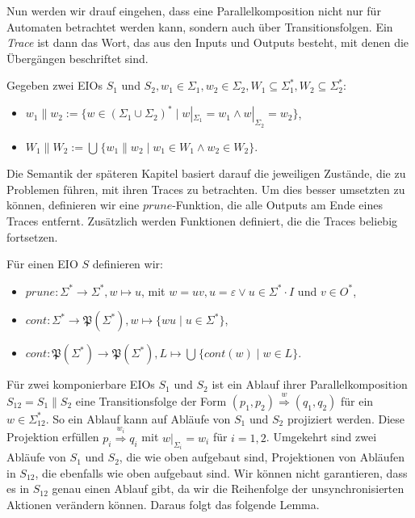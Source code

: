 Nun werden wir drauf eingehen, dass eine Parallelkomposition nicht nur für
Automaten betrachtet werden kann, sondern auch über Transitionsfolgen. Ein
\emph{Trace} ist dann das Wort, das aus den Inputs und Outputs besteht, mit denen die
Übergängen beschriftet sind.

\begin{Def}
  Gegeben zwei EIOs $S_1$ und $S_2,
  w_1\in\Sigma _1, w_2\in\Sigma _2, W_1\subseteq\Sigma _1^*, W_2\subseteq\Sigma
  _2^*$:
  \begin{itemize}
    \item $w_1\| w_2:=\{w\in (\Sigma _1\cup\Sigma _2)^*\mid w|_{\Sigma _1}=w_1\wedge
      w|_{\Sigma _2}=w_2\}$,
    \item $W_1\| W_2:=\bigcup\hspace{1pt}\{w_1\| w_2\mid w_1\in W_1\wedge w_2\in W_2\}$.
  \end{itemize}
\end{Def}

Die Semantik der späteren Kapitel basiert darauf die jeweiligen Zustände, die
zu Problemen führen, mit ihren Traces zu betrachten. Um dies besser umsetzten zu
können, definieren wir eine $prune$-Funktion, die alle Outputs am Ende
eines Traces entfernt. Zusätzlich werden Funktionen definiert, die
die Traces beliebig fortsetzen.

\begin{Def}
  Für einen EIO $S$ definieren wir:
  \begin{itemize}
    \item $prune:\Sigma ^*\rightarrow\Sigma ^*, w\mapsto u$, mit $w=uv,
      u=\varepsilon\vee u\in\Sigma ^*\cdot I$ und $v\in O^*$,
    \item $cont:\Sigma ^*\rightarrow\mathfrak{P}(\Sigma ^*),
      w\mapsto\{wu\mid u\in\Sigma ^*\}$,
    \item $cont:\mathfrak{P}(\Sigma ^*)\rightarrow\mathfrak{P}(\Sigma ^*),
      L\mapsto\bigcup\hspace{1pt}\{cont(w)\mid w\in L\}$.
  \end{itemize}
\end{Def}

Für zwei komponierbare EIOs $S_1$ und $S_2$ ist ein Ablauf ihrer
Parallelkomposition $S_{12}=S_1\| S_2$ eine Transitionsfolge der Form $(p_1,p_2)
\overset{w}{\Rightarrow} (q_1,q_2)$ für ein $w\in\Sigma_{12}^*$. So ein Ablauf
kann auf Abläufe von $S_1$ und $S_2$ projiziert werden. Diese Projektion
erfüllen $p_i \overset{w_i}{\Rightarrow} q_i$ mit $w|_{\Sigma
_i}=w_i$ für $i=1,2$. Umgekehrt sind zwei Abläufe von $S_1$ und $S_2$,
die wie oben aufgebaut sind, Projektionen von Abläufen in
$S_{12}$, die ebenfalls wie oben aufgebaut sind. Wir können nicht garantieren,
dass es in $S_{12}$ genau einen Ablauf gibt, da wir die Reihenfolge der
unsynchronisierten Aktionen verändern können. Daraus folgt das folgende Lemma.

